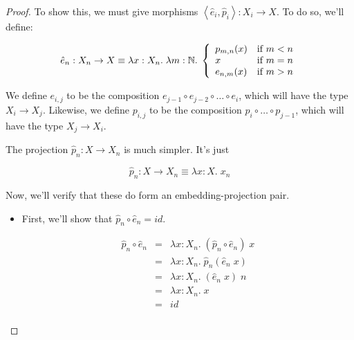 \begin{proof}
To show this, we must give morphisms $\left<\hat{e}_i,
\hat{p}_i\right> : X_i \to X$. To do so, we'll define:

\begin{displaymath}
  \hat{e}_n : X_n \to X \equiv 
    \lambda x:X_n.\; \lambda m:\mathbb{N}.\; 
       \left\{ 
          \begin{array}{ll}
            p_{m,n}(x) & \mbox{if } m < n \\
            x         & \mbox{if } m = n \\
            e_{n,m}(x) & \mbox{if } m > n \\
          \end{array}
       \right.
\end{displaymath}

We define $e_{i,j}$ to be the composition $e_{j-1} \circ e_{j-2} \circ \ldots \circ e_i$,
which will have the type $X_i \to X_j$. Likewise, we define $p_{i,j}$ to be the 
composition $p_i \circ \ldots \circ p_{j-1}$, which will have the type $X_j \to X_i$. 

\noindent The projection $\hat{p}_n : X \to X_n$ is much simpler. It's just

\begin{displaymath}
  \hat{p}_n : X \to X_n \equiv \lambda x:X.\; x_n
\end{displaymath}

Now, we'll verify that these do form an embedding-projection pair. 

  \begin{itemize}
  \item First, we'll show that $\hat{p}_n \circ \hat{e}_n = id$. 

    \begin{displaymath}
      \begin{array}{lcl}
        \hat{p}_n \circ \hat{e}_n & = & \lambda x:X_n.\; (\hat{p}_n \circ \hat{e}_n)\;x \\
                                  & = & \lambda x:X_n.\; \hat{p}_n(\hat{e}_n \;x) \\
                                  & = & \lambda x:X_n.\; (\hat{e}_n\;x)\;n \\
                                  & = & \lambda x:X_n.\; x \\
                                  & = & id \\
      \end{array}
    \end{displaymath}


\end{itemize}
\end{proof}
